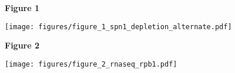 \documentclass[8pt]{extarticle}
\begin{document}
\textbf{\large Figure 1}

\texttt{[image: figures/figure\_1\_spn1\_depletion\_alternate.pdf]}


\newpage

\textbf{\large Figure 2}

\texttt{[image: figures/figure\_2\_rnaseq\_rpb1.pdf]}
\end{document}
